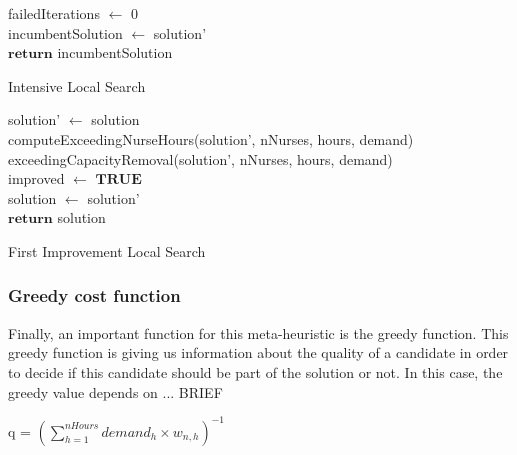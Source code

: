 \begin{algorithm}[H]


failedIterations $\leftarrow$ 0 \\
incumbentSolution $\leftarrow$ solution'\\
$\textbf{return}$ incumbentSolution
\caption{Intensive Local Search}\label{alg.mainLoop}
\end{algorithm}

\begin{algorithm}[H]

solution' $\leftarrow$ solution \\
computeExceedingNurseHours(solution', nNurses, hours, demand) \\
exceedingCapacityRemoval(solution', nNurses, hours, demand) \\
improved $\leftarrow$ $\textbf{TRUE}$ \\
solution $\leftarrow$ solution'\\
$\textbf{return}$ solution
\caption{First Improvement Local Search}\label{alg.mainLoop}
\end{algorithm}

\subsubsection{Greedy cost function}

Finally, an important function for this meta-heuristic is the greedy function. This greedy function is giving us information about the quality of a candidate in order to decide if this candidate should
be part of the solution or not. In this case, the greedy value depends on ... BRIEF

\begin{center}
q = $(\sum_{h=1}^{nHours} demand_h \times w_{n,h})^{-1}$
\end{center}

